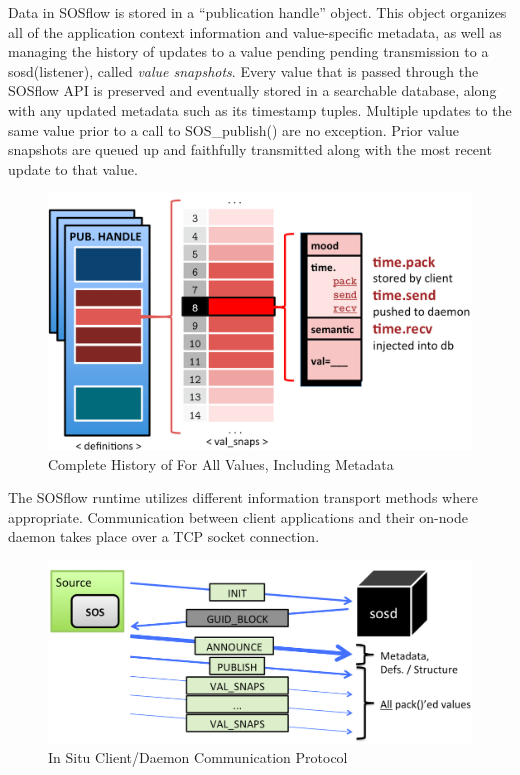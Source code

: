 Data in SOSflow is stored in a ``publication handle'' object.
%
This object organizes all of the application context information and
value-specific metadata, as well as managing the history of updates to
a value pending pending transmission to a sosd(listener), called
\textit{value snapshots}.
%
Every value that is passed through the SOSflow API is preserved and
eventually stored in a searchable database, along with any updated
metadata such as its timestamp tuples.
%
Multiple updates to the same value prior to a call to SOS\_publish()
are no exception.
%
Prior value snapshots are queued up and faithfully transmitted along
with the most recent update to that value.
\begin{figure}[h]
\centering
\includegraphics[width=\columnwidth]{images/val_snaps.png}
\caption{Complete History of For All Values, Including Metadata}
\label{fig_val_snaps}
\end{figure}
%
\par
%
The SOSflow runtime utilizes different information transport methods
where appropriate.
%
Communication between client applications and their on-node daemon
takes place over a TCP socket connection.
%
\begin{figure}[h]
\centering
\includegraphics[width=\columnwidth]{images/sosd_protocol.png}
\caption{In Situ Client/Daemon Communication Protocol}
\label{fig_sosd_protocol}
\end{figure}
